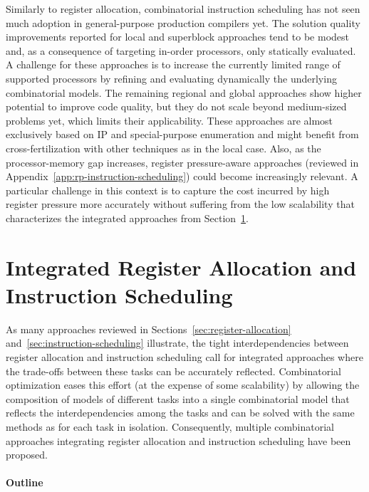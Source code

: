 \documentclass[acmsmall,authorversion,nonacm]{acmart}
\begin{document}
Similarly to register allocation, combinatorial instruction scheduling
has not seen much adoption in general-purpose production compilers
yet.
The solution quality improvements reported for local and superblock
approaches tend to be modest and, as a consequence of targeting
in-order processors, only statically evaluated.
A challenge for these approaches is to increase the currently limited
range of supported processors by refining and evaluating dynamically
the underlying combinatorial models.
The remaining regional and global approaches show higher potential to
improve code quality, but they do not scale beyond medium-sized
problems yet, which limits their applicability.
These approaches are almost exclusively based on IP and
special-purpose enumeration and might benefit from cross-fertilization
with other techniques as in the local case.
Also, as the processor-memory gap increases, register pressure-aware
approaches (reviewed in Appendix~\ref{app:rp-instruction-scheduling})
could become increasingly relevant.
A particular challenge in this context is to capture the cost incurred
by high register pressure more accurately without suffering from the
low scalability that characterizes the integrated approaches from
Section~\ref{sec:integrated}.

\section{Integrated Register Allocation and Instruction Scheduling}\label{sec:integrated}

As many approaches reviewed in Sections~\ref{sec:register-allocation}
and~\ref{sec:instruction-scheduling} illustrate, the tight
interdependencies between register allocation and instruction
scheduling call for integrated approaches where the trade-offs between
these tasks can be accurately reflected.
Combinatorial optimization eases this effort (at the expense of some
scalability) by allowing the composition of models of different tasks
into a single combinatorial model that reflects the interdependencies
among the tasks and can be solved with the same methods as for each
task in isolation.
Consequently, multiple combinatorial approaches integrating register
allocation and instruction scheduling have been proposed.

\paragraph{Outline}
\end{document}
